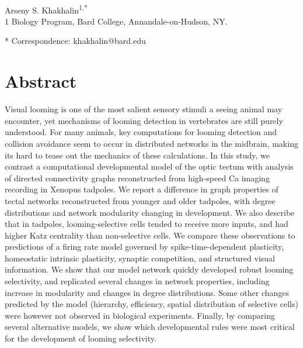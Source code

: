 \documentclass{article}
\begin{document}


\linenumbers %

\begin{flushleft}
{\Large
\textbf{}
}
\newline
\\
Arseny S. Khakhalin\textsuperscript{1,*}
\\
\bigskip
{1} Biology Program, Bard College, Annandale-on-Hudson, NY. 

* Correspondence: khakhalin@bard.edu

\section*{Abstract}
Visual looming is one of the most salient sensory stimuli a seeing animal may encounter, yet mechanisms of looming detection in vertebrates are still purely understood. For many animals, key computations for looming detection and collision avoidance seem to occur in distributed networks in the midbrain, making its hard to tease out the mechanics of these calculations. In this study, we contrast a computational developmental model of the optic tectum with analysis of directed connectivity graphs reconstructed from high-speed Ca imaging recording in Xenopus tadpoles. We report a difference in graph properties of tectal networks reconstructed from younger and older tadpoles, with degree distributions and network modularity changing in development. We also describe that in tadpoles, looming-selective cells tended to receive more inputs, and had higher Katz centrality than non-selective cells. We compare these observations to predictions of a firing rate model governed by spike-time-dependent plasticity, homeostatic intrinsic plasticity, synaptic competition, and structured visual information. We show that our model network quickly developed robust looming selectivity, and replicated several changes in network properties, including increase in modularity and changes in degree distributions. Some other changes predicted by the model (hierarchy, efficiency, spatial distribution of selective cells) were however not observed in biological experiments. Finally, by comparing several alternative models, we show which developmental rules were most critical for the development of looming selectivity.
\bigskip

\end{flushleft} %
\end{document}

